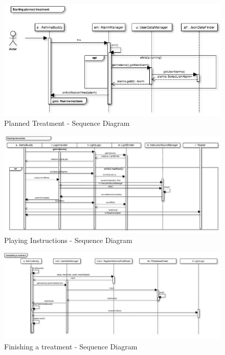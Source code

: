 \begin{figure}
	\centering
		\includegraphics[scale=0.6]{Pictures/sd/sd-planned-treatment.png}
	\caption{Planned Treatment - Sequence Diagram}
	\label{fig:ab-sd-planned-treatment}
\end{figure}

\begin{figure}
	\centering
		\includegraphics[scale=0.6]{Pictures/sd/sd-instructions.png}
	\caption{Playing Instructions - Sequence Diagram}
	\label{fig:ab-sd-instructions}
\end{figure}

\begin{figure}
	\centering
		\includegraphics[scale=0.6]{Pictures/sd/sd-complete-treatment.png}
	\caption{Finishing a treatment - Sequence Diagram}
	\label{fig:ab-sd-completing-treatment}
\end{figure}


